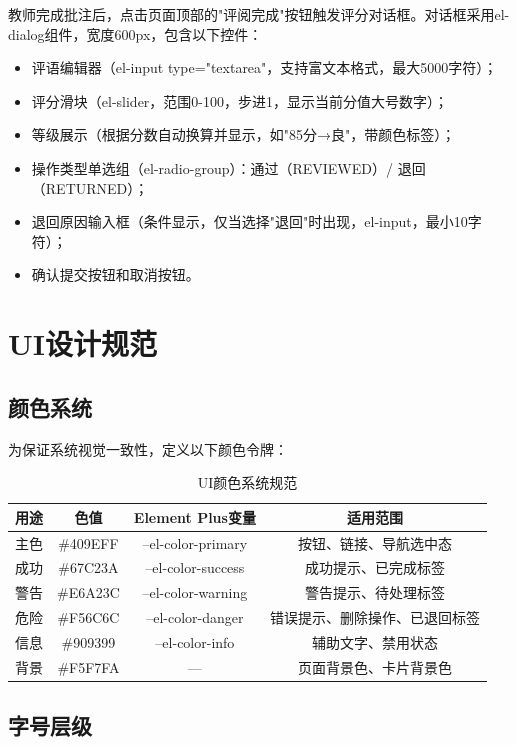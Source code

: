 \documentclass{../softeng}
\begin{document}
教师完成批注后，点击页面顶部的"评阅完成"按钮触发评分对话框。对话框采用el-dialog组件，宽度600px，包含以下控件：
\begin{itemize}
    \item 评语编辑器（el-input type="textarea"，支持富文本格式，最大5000字符）；
    \item 评分滑块（el-slider，范围0-100，步进1，显示当前分值大号数字）；
    \item 等级展示（根据分数自动换算并显示，如"85分→良"，带颜色标签）；
    \item 操作类型单选组（el-radio-group）：通过（REVIEWED）/ 退回（RETURNED）；
    \item 退回原因输入框（条件显示，仅当选择"退回"时出现，el-input，最小10字符）；
    \item 确认提交按钮和取消按钮。
\end{itemize}

\section{UI设计规范}

\subsection{颜色系统}

为保证系统视觉一致性，定义以下颜色令牌：

\begin{table}[htbp]
\centering
\caption{UI颜色系统规范}
\label{tab:ui_color}
\begin{tabular}{|c|c|c|c|}
\hline
\textbf{用途} & \textbf{色值} & \textbf{Element Plus变量} & \textbf{适用范围} \\
\hline
主色 & \#409EFF & --el-color-primary & 按钮、链接、导航选中态 \\
\hline
成功 & \#67C23A & --el-color-success & 成功提示、已完成标签 \\
\hline
警告 & \#E6A23C & --el-color-warning & 警告提示、待处理标签 \\
\hline
危险 & \#F56C6C & --el-color-danger & 错误提示、删除操作、已退回标签 \\
\hline
信息 & \#909399 & --el-color-info & 辅助文字、禁用状态 \\
\hline
背景 & \#F5F7FA & — & 页面背景色、卡片背景色 \\
\hline
\end{tabular}
\end{table}

\subsection{字号层级}
\end{document}
